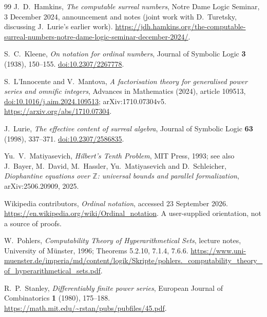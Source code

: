 \documentclass[11pt,oneside]{article}
\numberwithin{equation}{section}
\theoremstyle{definition}
\theoremstyle{remark}
\begin{document}
\begin{thebibliography}{99}
J.~D.~Hamkins, \emph{The computable surreal numbers}, Notre Dame Logic Seminar,
3 December 2024, announcement and notes (joint work with D.~Turetsky, discussing
J.~Lurie's earlier work).
\url{https://jdh.hamkins.org/the-computable-surreal-numbers-notre-dame-logic-seminar-december-2024/}.

S.~C.~Kleene, \emph{On notation for ordinal numbers}, Journal of Symbolic Logic
\textbf{3} (1938), 150--155. \href{https://doi.org/10.2307/2267778}{doi:10.2307/2267778}.

S.~L'Innocente and V.~Mantova, \emph{A factorisation theory for generalised power
series and omnific integers}, Advances in Mathematics (2024), article 109513,
\href{https://doi.org/10.1016/j.aim.2024.109513}{doi:10.1016/j.aim.2024.109513};
arXiv:1710.07304v5. \url{https://arxiv.org/abs/1710.07304}.

J.~Lurie, \emph{The effective content of surreal algebra}, Journal of Symbolic Logic
\textbf{63} (1998), 337--371. \href{https://doi.org/10.2307/2586835}{doi:10.2307/2586835}.

Yu.~V.~Matiyasevich, \emph{Hilbert's Tenth Problem}, MIT Press, 1993; see also
J.~Bayer, M.~David, M.~Hassler, Yu.~Matiyasevich and D.~Schleicher, \emph{Diophantine
equations over $\mathbb Z$: universal bounds and parallel formalization},
arXiv:2506.20909, 2025.

Wikipedia contributors, \emph{Ordinal notation}, accessed 23 September 2026.
\url{https://en.wikipedia.org/wiki/Ordinal_notation}. A user-supplied orientation,
not a source of proofs.

W.~Pohlers, \emph{Computability Theory of Hyperarithmetical Sets}, lecture notes,
University of M\"unster, 1996; Theorems 5.2.10, 7.1.4, 7.6.6.
\url{https://www.uni-muenster.de/imperia/md/content/logik/Skripte/pohlers._computability_theory_of_hyperarithmetical_sets.pdf}.

R.~P.~Stanley, \emph{Differentiably finite power series}, European Journal of
Combinatorics \textbf{1} (1980), 175--188.
\url{https://math.mit.edu/~rstan/pubs/pubfiles/45.pdf}.
\end{thebibliography}
\end{document}
